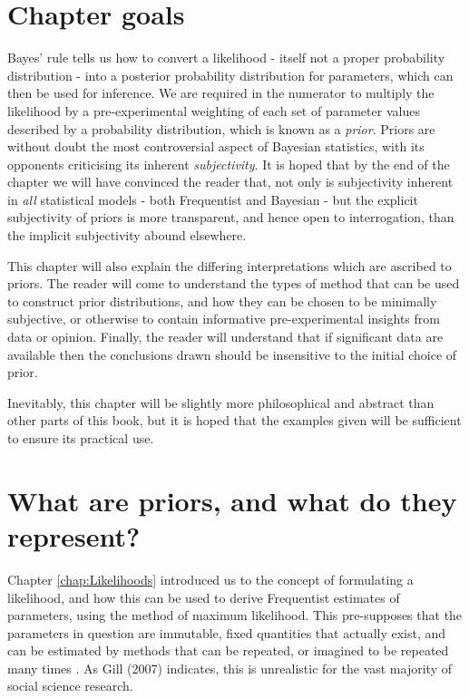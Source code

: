 \documentclass[11pt,fullpage]{book}
\begin{document}
\section{Chapter goals}
Bayes' rule tells us how to convert a likelihood - itself not a proper probability distribution - into a posterior probability distribution for parameters, which can then be used for inference. We are required in the numerator to multiply the likelihood by a pre-experimental weighting of each set of parameter values described by a probability distribution, which is known as a \textit{prior}. Priors are without doubt the most controversial aspect of Bayesian statistics, with its opponents criticising its inherent \textit{subjectivity}. It is hoped that by the end of the chapter we will have convinced the reader that, not only is subjectivity inherent in \textit{all} statistical models - both Frequentist and Bayesian - but the explicit subjectivity of priors is more transparent, and hence open to interrogation, than the implicit subjectivity abound elsewhere.

This chapter will also explain the differing interpretations which are ascribed to priors. The reader will come to understand the types of method that can be used to construct prior distributions, and how they can be chosen to be minimally subjective, or otherwise to contain informative pre-experimental insights from data or opinion. Finally, the reader will understand that if significant data are available then the conclusions drawn should be insensitive to the initial choice of prior.

Inevitably, this chapter will be slightly more philosophical and abstract than other parts of this book, but it is hoped that the examples given will be sufficient to ensure its practical use.

\section{What are priors, and what do they represent?}
Chapter \ref{chap:Likelihoods} introduced us to the concept of formulating a likelihood, and how this can be used to derive Frequentist estimates of parameters, using the method of maximum likelihood. This pre-supposes that the parameters in question are immutable, fixed quantities that actually exist, and can be estimated by methods that can be repeated, or imagined to be repeated many times \cite{gill2007bayesian}. As Gill (2007) indicates, this is unrealistic for the vast majority of social science research.
\end{document}
